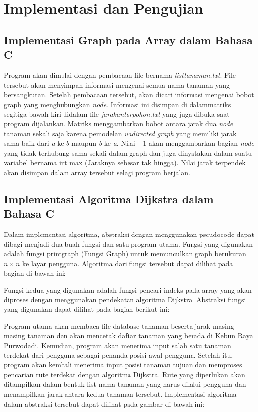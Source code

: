 \documentclass[conference]{IEEEtran}
\begin{document}
	\section{Implementasi dan Pengujian}
	\subsection{Implementasi Graph pada Array dalam Bahasa C}
	Program akan dimulai dengan pembacaan file bernama \textit{listtanaman.txt}. File tersebut akan menyimpan informasi mengenai semua nama tanaman yang bersangkutan. Setelah pembacaan tersebut, akan dicari informasi mengenai bobot graph yang menghubungkan \textit{node}. Informasi ini disimpan di dalammatriks segitiga bawah kiri didalam file \textit{jarakantarpohon.txt} yang juga dibuka saat program dijalankan. Matriks menggambarkan bobot antara jarak dua \textit{node} tanaman sekali saja karena pemodelan \textit{undirected graph} yang memiliki jarak sama baik dari \textit{a} ke \textit{b} maupun \textit{b} ke \textit{a}. Nilai \begin{math} -1 \end{math} akan menggambarkan bagian \textit{node} yang tidak terhubung sama sekali dalam graph dan juga dinyatakan dalam suatu variabel bernama int max (Jaraknya sebesar tak hingga). Nilai jarak terpendek akan disimpan dalam array tersebut selagi program berjalan.

	\subsection{Implementasi Algoritma Dijkstra dalam Bahasa C}
	Dalam implementasi algoritma, abstraksi dengan menggunakan pseudocode dapat dibagi menjadi dua buah fungsi dan satu program utama. Fungsi yang digunakan adalah fungsi printgraph (Fungsi Graph) untuk memunculkan graph berukuran \begin{math} n \times n \end{math} ke layar pengguna. Algoritma dari fungsi tersebut dapat dilihat pada bagian di bawah ini:

	Fungsi kedua yang digunakan adalah fungsi pencari indeks pada array yang akan diproses dengan menggunakan pendekatan algoritma Dijkstra. Abstraksi fungsi yang digunakan dapat dilihat pada bagian berikut ini:

	Program utama akan membaca file database tanaman beserta jarak masing-masing tanaman dan akan mencetak daftar tanaman yang berada di Kebun Raya Purwodadi. Kemudian, program akan menerima input salah satu tanaman terdekat dari pengguna sebagai penanda posisi awal pengguna. Setelah itu, program akan kembali menerima input posisi tanaman tujuan dan memproses pencarian rute terdekat dengan algoritma Dijkstra. Rute yang diperlukan akan ditampilkan dalam bentuk list nama tanaman yang harus dilalui pengguna dan menampilkan jarak antara kedua tanaman tersebut. Implementasi algoritma dalam abstraksi tersebut dapat dilihat pada gambar di bawah ini:
\end{document}
